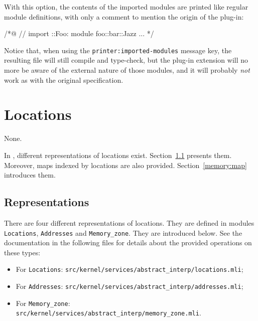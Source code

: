 With this option, the contents of the imported modules are printed like regular
module definitions, with only a comment to mention the origin of the plug-in:
\begin{ccode}
/*@ // import \myplugin::Foo:
    module foo::bar::Jazz {
        ...
    }
  */
\end{ccode}

Notice that, when using the \verb+printer:imported-modules+ message key, the
resulting file will still compile and type-check, but the plug-in extension will
no more be aware of the external nature of those modules, and it will probably
\emph{not} work as with the original specification.


\section{Locations}\label{adv:memory}

\begin{prereq}
  None.
\end{prereq}

In \framac, different representations of \C locations
exist. Section~\ref{memory:repr} presents them. Moreover, maps indexed by
locations are also provided. Section~\ref{memory:map} introduces them.

\subsection{Representations}\label{memory:repr}

There are four different representations of \C locations.
They are defined in modules
\texttt{Locations},
\texttt{Addresses} and
\texttt{Memory\_zone}. They are introduced below.
See the documentation in the following files for details about the
provided operations on these types:
\begin{itemize}
  \item For \texttt{Locations}:
    \texttt{src/kernel/services/abstract\_interp/locations.mli};
  \item For \texttt{Addresses}:
    \texttt{src/kernel/services/abstract\_interp/addresses.mli};
  \item For \texttt{Memory\_zone}:
    \texttt{src/kernel/services/abstract\_interp/memory\_zone.mli}.
\end{itemize}

